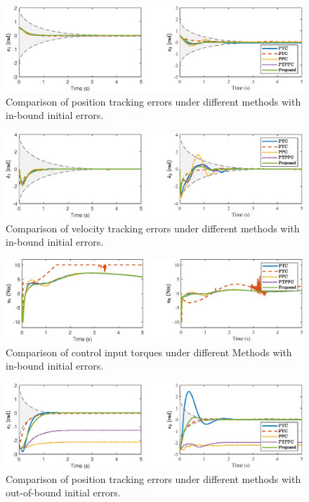\documentclass[pdflatex,sn-mathphys-num]{sn-jnl}%
\theoremstyle{thmstyleone}%
\theoremstyle{thmstyletwo}%
\theoremstyle{thmstylethree}%
\begin{document}
\begin{figure}[H]
	\centering
	\includegraphics[width=0.9\linewidth]{fig9.eps}
	\caption{Comparison of position tracking errors under different methods with in-bound initial errors.}
	\label{fig:9}
\end{figure}

\begin{figure}[H]
	\centering
	\includegraphics[width=0.9\linewidth]{fig10.eps}
	\caption{Comparison of velocity tracking errors under different methods with in-bound initial errors.}
	\label{fig:10}
\end{figure}

\begin{figure}[H]
	\centering
	\includegraphics[width=0.9\linewidth]{fig11.eps}
	\caption{Comparison of control input torques under different Methods with in-bound initial errors.}
	\label{fig:11}
\end{figure}

\begin{figure}[H]
	\centering
	\includegraphics[width=0.9\linewidth]{fig12.eps}
	\caption{Comparison of position tracking errors under different methods with out-of-bound initial errors.}
	\label{fig:12}
\end{figure}
\end{document}

